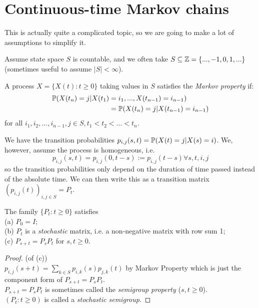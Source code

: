 \documentclass[a4paper]{article}
\begin{document}
\newpage

\section{Continuous-time Markov chains}

This is actually quite a complicated topic, so we are going to make a lot of assumptions to simplify it.

Assume state space $S$ is countable, and we often take $S \subseteq \Z = \{ ...,-1,0,1,...\}$ (sometimes useful to assume $|S|<\infty$).

\begin{defi}
A process $X = \{X(t) : t \geq 0\}$ taking values in $S$ satisfies the \emph{Markov property} if:\\
\begin{equation*}
\begin{aligned}
\P(X(t_n) = j| X(t_1) &= i_1,...,X(t_{n-1}) = i_{n-1}) \\
&= \P(X(t_n) = j| X(t_{n-1}) = i_{n-1})
\end{aligned}
\end{equation*}
for all $i_1,i_2,...,i_{n-1}, j \in S, t_1< t_2 < ... < t_n$.

We have the transition probabilities $p_{i,j}(s,t) = \P(X(t) = j| X(s) = i)$. We, however, assume the process is homogeneous, i.e. $$p_{i,j}(s,t) = p_{i,j} (0,t-s) := p_{i,j}(t-s) \forall s,t,i,j$$so the transition probabilities only depend on the duration of time passed instead of the absolute time. We can then write this as a transition matrix $(p_{i,j}(t))_{i,j \in S}=P_t$.
\end{defi}

\begin{prop}
The family $\{P_t: t \geq 0\}$ satisfies\\
(a) $P_0 = I$;\\
(b) $P_t$ is a \emph{stochastic} matrix, i.e. a non-negative matrix with row sum 1;\\
(c) $P_{s+t} = P_s P_t$ for $s,t \geq 0$.
\begin{proof} (of (c))\\
$p_{i,j}(s+t) = \sum_{k \in S} p_{i,k}(s)p_{j,k}(t)$ by Markov Property which is just the component form of $P_{s+t} = P_s P_t$.\\
$P_{s+t} = P_s P_t$ is sometimes called the \emph{semigroup property} ($s,t \geq 0$).\\
$(P_t:t \geq 0)$ is called a \emph{stochastic semigroup}.
\end{proof}
\end{prop}
\end{document}
